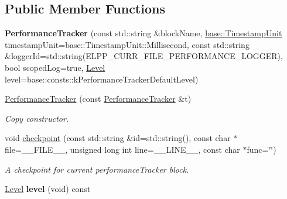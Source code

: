 \subsection*{Public Member Functions}
\begin{DoxyCompactItemize}
\item 
\mbox{\label{classel_1_1base_1_1_performance_tracker_a46ac6a851c6d1cde6742a7ebfeedd1b6}} 
{\bfseries Performance\+Tracker} (const std\+::string \&block\+Name, \hyperlink{namespaceel_1_1base_a1b886858c6409097395b24b1bdf03c39}{base\+::\+Timestamp\+Unit} timestamp\+Unit=base\+::\+Timestamp\+Unit\+::\+Millisecond, const std\+::string \&logger\+Id=std\+::string(E\+L\+P\+P\+\_\+\+C\+U\+R\+R\+\_\+\+F\+I\+L\+E\+\_\+\+P\+E\+R\+F\+O\+R\+M\+A\+N\+C\+E\+\_\+\+L\+O\+G\+G\+ER), bool scoped\+Log=true, \hyperlink{namespaceel_ab0ac6091262344c52dd2d3ad099e8e36}{Level} level=base\+::consts\+::k\+Performance\+Tracker\+Default\+Level)
\item 
\mbox{\label{classel_1_1base_1_1_performance_tracker_a49e655c1f414f904b2d6a9abb0d344f4}} 
\hyperlink{classel_1_1base_1_1_performance_tracker_a49e655c1f414f904b2d6a9abb0d344f4}{Performance\+Tracker} (const \hyperlink{classel_1_1base_1_1_performance_tracker}{Performance\+Tracker} \&t)
\begin{DoxyCompactList}\small\item\em Copy constructor. \end{DoxyCompactList}\item 
\mbox{\label{classel_1_1base_1_1_performance_tracker_aec9a6e149674c5782cc855e49aeb0aaf}} 
void \hyperlink{classel_1_1base_1_1_performance_tracker_aec9a6e149674c5782cc855e49aeb0aaf}{checkpoint} (const std\+::string \&id=std\+::string(), const char $\ast$file=\+\_\+\+\_\+\+F\+I\+L\+E\+\_\+\+\_\+, unsigned long int line=\+\_\+\+\_\+\+L\+I\+N\+E\+\_\+\+\_\+, const char $\ast$func=\char`\"{}\char`\"{})
\begin{DoxyCompactList}\small\item\em A checkpoint for current performance\+Tracker block. \end{DoxyCompactList}\item 
\mbox{\label{classel_1_1base_1_1_performance_tracker_a32813204a52c21d8beb114b847375088}} 
\hyperlink{namespaceel_ab0ac6091262344c52dd2d3ad099e8e36}{Level} {\bfseries level} (void) const
\end{DoxyCompactItemize}
